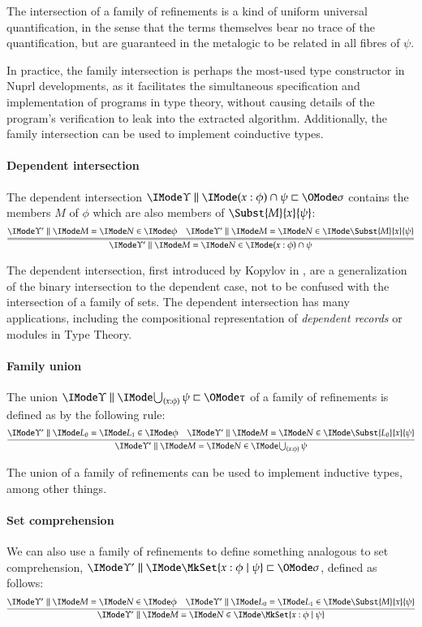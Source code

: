 \documentclass[11pt]{article}
\theoremstyle{definition}
\theoremstyle{notation}
\theoremstyle{remark}
\numberwithin{equation}{section}
\begin{document}
The intersection of a family of refinements is a kind of uniform universal
quantification, in the sense that the terms themselves bear no trace of the
quantification, but are guaranteed in the metalogic to be related in all fibres
of $\psi$.

In practice, the family intersection is perhaps the most-used type constructor
in Nuprl developments, as it facilitates the simultaneous specification and
implementation of programs in type theory, without causing details of the
program's verification to leak into the extracted algorithm. Additionally, the
family intersection can be used to implement coinductive types.

\paragraph{Dependent intersection}
The dependent intersection $\Refines{\Upsilon}{(x:\phi)\cap\psi}{\sigma}$
contains the members $M$ of $\phi$ which are also members of
$\Subst{M}{x}{\psi}$:
\[
  \infer={
    \RMemEq{\Upsilon'}{M}{N}{
      (x:\phi)\cap\psi
    }
  }{
    \RMemEq{\Upsilon'}{M}{N}{\phi} &
    \RMemEq{\Upsilon'}{M}{N}{
      \Subst{M}{x}{\psi}
    }
  }
\]

The dependent intersection, first introduced by Kopylov in \cite{kopylov:2000},
are a generalization of the binary intersection to the dependent case, not to
be confused with the intersection of a family of sets. The dependent
intersection has many applications, including the compositional representation
of \emph{dependent records} or modules in Type Theory.

\paragraph{Family union}
The union $\Refines{\Upsilon}{\bigcup_{(x:\phi)}\psi}{\tau}$ of a family of
refinements is defined as by the following rule:
\[
  \infer{
    \RMemEq{\Upsilon'}{M}{N}{
      \bigcup_{(x:\phi)}\psi
    }
  }{
    \RMemEq{\Upsilon'}{L_0}{L_1}{\phi} &
    \RMemEq{\Upsilon'}{M}{N}{
      \Subst{L_0}{x}{\psi}
    }
  }
\]

The union of a family of refinements can be used to implement inductive types,
among other things.

\paragraph{Set comprehension}

We can also use a family of refinements to define something analogous to set
comprehension, $\Refines{\Upsilon'}{\MkSet{x:\phi\mid\psi}}{\sigma}$, defined
as follows:
\[
  \infer{
    \RMemEq{\Upsilon'}{M}{N}{
      \MkSet{x:\phi\mid\psi}
    }
  }{
    \RMemEq{\Upsilon'}{M}{N}{\phi} &
    \RMemEq{\Upsilon'}{L_0}{L_1}{
      \Subst{M}{x}{\psi}
    }
  }
\]
\end{document}
